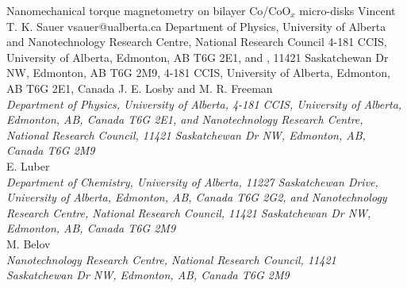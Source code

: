\begin{conf-abstract}[]
{Nanomechanical torque magnetometry on bilayer Co/CoO$_{x}$ micro-disks}
{\color{blue} Vincent T. K. Sauer}
{vsauer@ualberta.ca}
{Department of Physics, University of Alberta and Nanotechnology Research Centre, National Research Council 4-181 CCIS, University of Alberta, Edmonton, AB  T6G 2E1, and , 11421 Saskatchewan Dr NW, Edmonton, AB T6G 2M9, 4-181 CCIS, University of Alberta, Edmonton, AB  T6G 2E1, Canada}
{{\color{blue}J. E. Losby and M. R. Freeman}\\ \textit{Department of Physics, University of Alberta, 4-181 CCIS, University of Alberta, Edmonton, AB, Canada  T6G 2E1, and Nanotechnology Research Centre, National Research Council, 11421 Saskatchewan Dr NW, Edmonton, AB, Canada  T6G 2M9}\\ 
{\color{blue}E. Luber}\\ \textit{ Department of Chemistry, University of Alberta, 11227 Saskatchewan Drive, University of Alberta, Edmonton, AB, Canada  T6G 2G2, and Nanotechnology Research Centre, National Research Council, 11421 Saskatchewan Dr NW, Edmonton, AB, Canada  T6G 2M9}\\ 
{\color{blue}M. Belov}\\ \textit{Nanotechnology Research Centre, National Research Council, 11421 Saskatchewan Dr NW, Edmonton, AB, Canada  T6G 2M9}\\ 
\decofourleft \decofourright}





\printbibliography[heading=none]

\end{conf-abstract}
